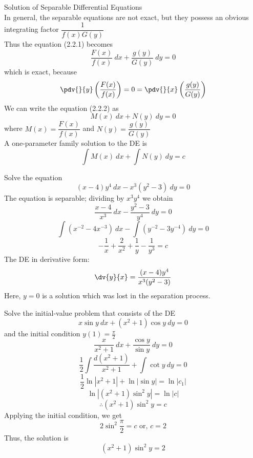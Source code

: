 \begin{theorem}{Solution of Separable Differential Equations}{}
    \\In general, the separable equations are not exact, but they possess an obvious integrating factor $\dfrac{1}{f(x)G(y)}$ \\
    Thus the equation (2.2.1) becomes
    \begin{equation}
        \frac{F(x)}{f(x)} \: d{x} + \frac{g(y)}{G(y)} \: d{y} = 0
    \end{equation}
    which is exact, because \[
        \pdv{}{y} \left( \frac{F(x)}{f(x)} \right) = 0 = \pdv{}{x} \left( \frac{g(y)}{G(y)} \right)
    \]
    We can write the equation (2.2.2) as \[
        M(x) \: d{x} + N(y) \: d{y} = 0
    \] where $M(x) = \dfrac{F(x)}{f(x)}$ and $N(y) = \dfrac{g(y)}{G(y)}$ \\
    A one-parameter family solution to the DE is
    \begin{equation}
        \int{M(x)} \: d{x} + \int{N(y)} \: d{y} = c
    \end{equation}
\end{theorem}

\begin{example}{Solve the equation \[
    (x-4)y^4 \: d{x} - x^3(y^2-3) \: d{y} = 0
\]}{}
    The equation is separable; dividing by $x^3y^4$ we obtain
    \[ \frac{x-4}{x^3} \: d{x} - \frac{y^2-3}{y^4} \: d{y} = 0 \]
    \[ \int{(x^{-2} - 4x^{-3})} \: d{x} - \int{(y^{-2} - 3y^{-4})} \: d{y} = 0 \]
    \[ \boxed{-\frac{1}{x} + \frac{2}{x^2} + \frac{1}{y} - \frac{1}{y^3} = c} \]
    The DE in derivative form:
    \[ \dv{y}{x} = \frac{(x-4)y^4}{x^3(y^2-3)} \]
    Here, $y=0$ is a solution which was lost in the separation process.
\end{example}

\begin{example}{Solve the initial-value problem that consists of the DE \[
        x\sin{y} \: d{x} + (x^2+1)\cos{y} \: d{y} = 0
\] and the initial condition $y(1) = \frac{\pi}{2}$}{}
    \[ \frac{x}{x^2+1} \: d{x} + \frac{\cos y}{\sin y} \: d{y} = 0 \]
    \[ \frac{1}{2}\int{\frac{d(x^2+1)}{x^2+1}} + \int{\cot y} \: d{y} = 0 \]
    \[ \frac{1}{2}\ln|x^2+1| + \ln|\sin y| = \ln|c_1| \]
    \[ \ln|(x^2+1)\sin^2 y| = \ln|c| \]
    \[ \therefore (x^2+1)\sin^2y = c \]
    Applying the initial condition, we get \[
        2\sin^2\frac{\pi}{2} = c \text{ or, } c = 2
    \] Thus, the solution is
    \[ \boxed{(x^2+1)\sin^2y = 2} \]
\end{example}


